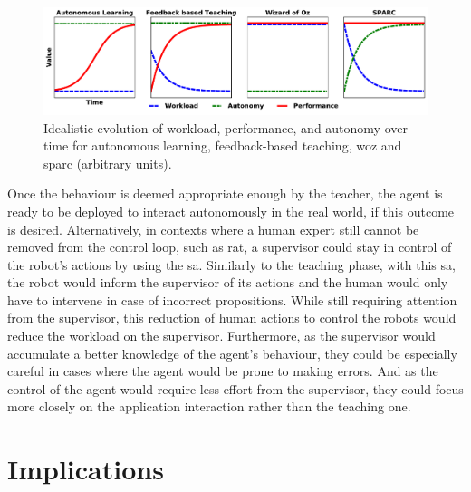 \begin{figure}[ht]
	\includegraphics[width=1\linewidth]{concept.pdf}
	\centering
	\caption{Idealistic evolution of workload, performance, and autonomy over time for autonomous learning, feedback-based teaching, \gls{woz} and \gls{sparc} (arbitrary units).}
	\label{fig:concept}
\end{figure}
Once the behaviour is deemed appropriate enough by the teacher, the agent is ready to be deployed to interact autonomously in the real world, if this outcome is desired. Alternatively, in contexts where a human expert still cannot be removed from the control loop, such as \gls{rat}, a supervisor could stay in control of the robot's actions by using the \gls{sa}. Similarly to the teaching phase, with this \gls{sa}, the robot would inform the supervisor of its actions and the human would only have to intervene in case of incorrect propositions. While still requiring attention from the supervisor, this reduction of human actions to control the robots would reduce the workload on the supervisor. Furthermore, as the supervisor would accumulate a better knowledge of the agent's behaviour, they could be especially careful in cases where the agent would be prone to making errors. And as the control of the agent would require less effort from the supervisor, they could focus more closely on the application interaction rather than the teaching one. 

\section{Implications}

